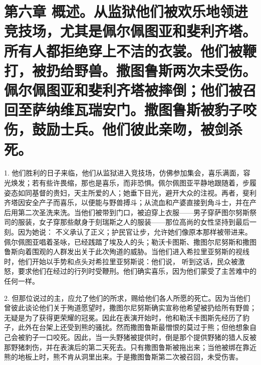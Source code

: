 
\section{第六章 概述。从监狱他们被欢乐地领进竞技场，尤其是佩尔佩图亚和斐利齐塔。所有人都拒绝穿上不洁的衣裳。他们被鞭打，被扔给野兽。撒图鲁斯两次未受伤。佩尔佩图亚和斐利齐塔被摔倒；他们被召回至萨纳维瓦瑞安门。撒图鲁斯被豹子咬伤，鼓励士兵。他们彼此亲吻，被剑杀死。}

1. 他们胜利的日子来临，他们从监狱进入竞技场，仿佛参加集会，喜乐满面，容光焕发；若有些许畏缩，那也是喜乐，而非恐惧。佩尔佩图亚平静地跟随着，步履姿态如同基督的贵妇，天主所爱的人；她垂下目光，避开大众的注视。再者，斐利齐塔因安全产子而喜乐，以便能与野兽搏斗；从流血和产婆直接到角斗士，并在产后用第二次圣洗来洗。当他们被带到门口，被迫穿上衣服——男子穿萨图尔努斯祭司的服装，女子穿那些献身于刻瑞斯之人的服装——那位高尚的女性坚持到最后一刻。因为她说： 不义承认了正义；护民官让步，允许她们像原本那样被带进来。佩尔佩图亚唱着圣咏，已经践踏了埃及人的头；勒沃卡图斯、撒图尔尼努斯和撒图鲁斯向着围观的人群发出关于此次殉道的威胁。当他们进入希拉里亚努斯的视线时，他们开始以手势和点头对希拉里亚努斯说：他们说， 听到这话，民众被激怒，要求他们在经过的行列时受鞭刑。他们确实喜乐，因为他们蒙受了主苦难中的任何一样。\par

2. 但那位说过的主，应允了他们的所求，赐给他们各人所愿的死亡。因为当他们曾彼此谈论他们关于殉道愿望时，撒图尔尼努斯确实宣称他希望被扔给所有野兽；无疑是为了获得更荣耀的冠冕。因此在表演开始时，他和勒沃卡图斯先经历了豹子，此外在台架上还受到熊的骚扰。然而撒图鲁斯最憎恨的莫过于熊；但他想象自己会被豹子一口咬死。因此，当一头野猪被提供时，倒是那个提供野猪的猎人反被那野猪刺伤，并在表演后的第二天死去。只有撒图鲁斯被拖出来；当他被绑在靠近熊的地板上时，熊不肯从洞里出来。于是撒图鲁斯第二次被召回，未受伤害。\par

